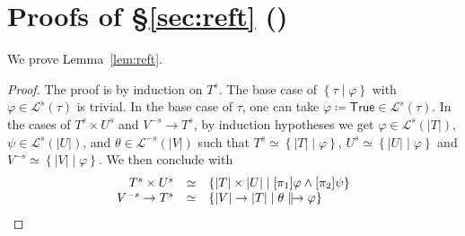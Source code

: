 \documentclass[%
  a4paper,
  UKenglish,
  cleveref,
  autoref,
  thm-restate,
  numberwithinsect,
]{lipics-v2021}
\newcommand\deq\coloneqq
\newcommand\temp[1]{\mathsf{#1}}
\newcommand\True{\temp{True}}
\newcommand\arrow\to
\newcommand\eqtype\simeq
\newcommand\reft[1]{\left\{ #1 \right\}}
\newcommand\defrealto{\mathrel\parallel\joinrel\to}
\newcommand\realto{\mathrel{\defrealto}}
\newcommand\PT{\tau}		%
\newcommand\RT{T}               %
\newcommand\RTbis{U}            %
\newcommand\RTter{V}            %
\newcommand\UPT[1]{\vert #1 \vert}        %
\newcommand\Lang{\mathcal{L}}
\newcommand\form[1]{\lbrack #1 \rbrack}
\newcommand\sign{s}
\begin{document}




\section{Proofs of \S\ref{sec:reft} ()}
\label{sec:proof:reft}

We prove Lemma~\ref{lem:reft}.

\LemReft*

\begin{proof}
The proof is by induction on $\RT^\sign$.
The base case of $\reft{\PT \mid \varphi}$
with $\varphi \in \Lang^\sign(\PT)$ is trivial.
In the base case of $\PT$, one can take $\varphi \deq \True \in \Lang^\sign(\PT)$.
In the cases of $\RT^\sign \times \RTbis^\sign$
and $\RTter^{-\sign} \arrow \RT^\sign$,
by induction hypotheses we get
$\varphi \in \Lang^\sign(\UPT\RT)$,
$\psi \in \Lang^\sign(\UPT\RTbis)$,
and $\theta \in \Lang^{-\sign}(\UPT\RTter)$
such that
$\RT^\sign \eqtype \reft{\UPT\RT \mid \varphi}$,
$\RTbis^\sign \eqtype \reft{\UPT\RTbis \mid \varphi}$
and
$\RTter^{-\sign} \eqtype \reft{\UPT\RTter \mid \varphi}$.
We then conclude with
\[
\begin{array}{r c l}
  \RT^\sign \times \RTbis^\sign
& \eqtype
& \reft{\UPT\RT \times \UPT\RTbis \mid \form{\pi_1}\varphi \land \form{\pi_2}\psi}
\\
%
  \RTter^{-\sign} \arrow \RT^\sign
& \eqtype
& \reft{\UPT\RTter \arrow \UPT\RT \mid \theta \realto \varphi}
\end{array}
\]
\end{proof}




\end{document}
